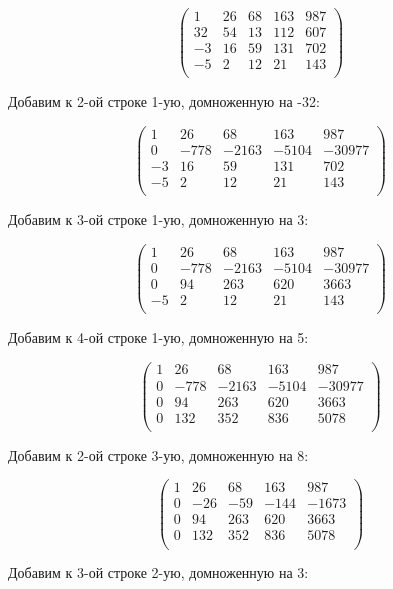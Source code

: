 	\[
	\begin{pmatrix}
	1 & 26 & 68 & 163 & 987 \\
	32 & 54 & 13 & 112 & 607 \\
	-3 & 16 & 59 & 131 & 702 \\
	-5 & 2 & 12 & 21 & 143 \\
	\end{pmatrix}
	\]
	
	Добавим к 2-ой строке 1-ую, домноженную на -32:
	
	\[
	\begin{pmatrix}
	1 & 26 & 68 & 163 & 987 \\
	0 & -778 & -2163 & -5104 & -30977 \\
	-3 & 16 & 59 & 131 & 702 \\
	-5 & 2 & 12 & 21 & 143 \\
	\end{pmatrix}
	\]
	
	Добавим к 3-ой строке 1-ую, домноженную на 3:
	
	\[
	\begin{pmatrix}
	1 & 26 & 68 & 163 & 987 \\
	0 & -778 & -2163 & -5104 & -30977 \\
	0 & 94 & 263 & 620 & 3663 \\
	-5 & 2 & 12 & 21 & 143 \\
	\end{pmatrix}
	\]
	
	Добавим к 4-ой строке 1-ую, домноженную на 5:
	
	\[
	\begin{pmatrix}
	1 & 26 & 68 & 163 & 987 \\
	0 & -778 & -2163 & -5104 & -30977 \\
	0 & 94 & 263 & 620 & 3663 \\
	0 & 132 & 352 & 836 & 5078 \\
	\end{pmatrix}
	\]
	
	Добавим к 2-ой строке 3-ую, домноженную на 8:
	
	\[
	\begin{pmatrix}
	1 & 26 & 68 & 163 & 987 \\
	0 & -26 & -59 & -144 & -1673 \\
	0 & 94 & 263 & 620 & 3663 \\
	0 & 132 & 352 & 836 & 5078 \\
	\end{pmatrix}
	\]
	
	Добавим к 3-ой строке 2-ую, домноженную на 3:
	
